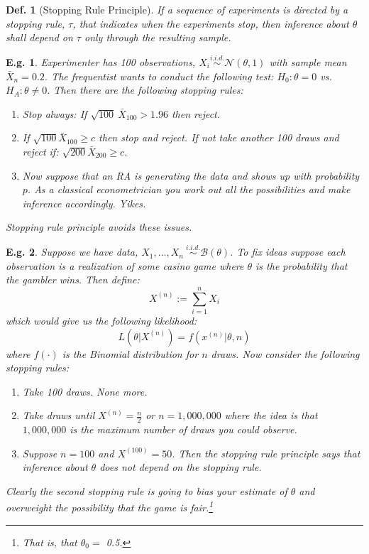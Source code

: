 \documentclass{tufte-book}
\theoremstyle{mytheoremstyle}
\theoremstyle{mylemstyle}
\theoremstyle{mydefstyle}
\newtheorem*{mydef}{Def.}
\newtheorem*{ex}{E.g.}
\begin{document}
\begin{mydef}[Stopping Rule Principle] If a sequence of experiments is directed by a stopping rule, \(\tau\), that indicates when the experiments stop, then inference about \(\theta\) shall depend on \(\tau\) only through the resulting sample. \end{mydef}
\begin{ex} Experimenter has 100 observations, \(X_i \overset{i.i.d.}{\sim} \mathcal{N}(\theta, 1)\) with sample mean \(\bar{X}_n = 0.2\). The frequentist wants to conduct the following test: \(H_0: \theta = 0\) vs. \(H_A: \theta \ne 0\). Then there are the following stopping rules: \begin{enumerate}
	\item Stop always: If \(\sqrt{100}\ \bar{X}_{100} > 1.96\) then reject.
	\item If \(\sqrt{100}\bar{X}_{100} \ge c\) then stop and reject. If not take another 100 draws and reject if: \(\sqrt{200}\bar{X}_{200} \ge c\). 
	\item Now suppose that an RA is generating the data and shows up with probability \(p\). As a classical econometrician you work out all the possibilities and make inference accordingly. Yikes.
\end{enumerate} 
Stopping rule principle avoids these issues. \end{ex}
\begin{ex} Suppose we have data, \(X_1, \dots, X_n\ \overset{i.i.d.}{\sim} \mathcal{B}(\theta)\). To fix ideas suppose each observation is a realization of some casino game where \(\theta\) is the probability that the gambler wins. Then define:
	\[X^{(n)} := \sum_{i=1}^n X_i\]
which would give us the following likelihood:
	\[L(\theta| X^{(n)}) = f(x^{(n)}|\theta, n)\]
where \(f(\cdot)\) is the Binomial distribution for \(n\) draws. Now consider the following stopping rules: \begin{enumerate}
	\item Take 100 draws. None more.
	\item Take draws until \(X^{(n)} = \frac{n}{2}\) or \(n = 1,000,000\) where the idea is that \(1,000,000\) is the maximum number of draws you could observe.
	\item Suppose \(n = 100\) and \(X^{(100)} = 50\). Then the stopping rule principle says that inference about \(\theta\) does not depend on the stopping rule. 
\end{enumerate}
Clearly the second stopping rule is going to bias your estimate of \(\theta\) and overweight the possibility that the game is fair.\footnote{That is, that \(\theta_0 =\) 0.5.} 
\end{ex}
\end{document}
